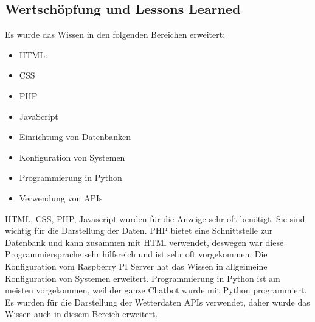 \subsection{Wertschöpfung und Lessons Learned}
Es wurde das Wissen in den folgenden Bereichen erweitert: \\
\begin{itemize}
	\item HTML: 
\end{itemize}
\begin{itemize}
	\item CSS
\end{itemize}
\begin{itemize}
	\item PHP
\end{itemize}
\begin{itemize}
	\item JavaScript
\end{itemize}
\begin{itemize}
	\item Einrichtung von Datenbanken
\end{itemize}
\begin{itemize}
	\item Konfiguration von Systemen
\end{itemize} 
\begin{itemize}
	\item Programmierung in Python
\end{itemize}
 \begin{itemize}
 	\item Verwendung von APIs
 \end{itemize}
HTML, CSS, PHP, Javascript wurden f\"ur die Anzeige sehr oft ben\"otigt. Sie sind wichtig f\"ur die Darstellung der Daten. PHP bietet eine Schnittstelle zur Datenbank und kann zusammen mit HTMl verwendet, deswegen war diese Programmiersprache sehr hilfsreich und ist sehr oft vorgekommen. Die Konfiguration vom Raspberry PI Server hat das Wissen in allgeimeine Konfiguration von Systemen erweitert. Programmierung in Python ist am meisten vorgekommen, weil der ganze Chatbot wurde mit Python programmiert. Es wurden f\"ur die Darstellung der Wetterdaten APIs verwendet, daher wurde das Wissen auch in diesem Bereich erweitert. 
\label{\docname}

